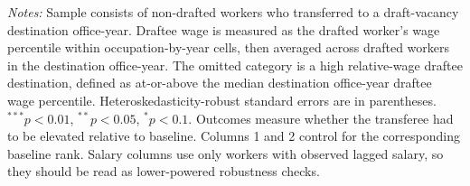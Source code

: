 \begin{table}[htbp]
\centering
\caption{Stretch and Misallocation by Relative Draftee Wage}
\label{tab:stretch-misallocation-relative-draftee-wage}
\scriptsize
\begin{threeparttable}
%
\begin{tablenotes}[flushleft]\footnotesize
\item \textit{Notes:} Sample consists of non-drafted workers who transferred to a draft-vacancy destination office-year. Draftee wage is measured as the drafted worker's wage percentile within occupation-by-year cells, then averaged across drafted workers in the destination office-year. The omitted category is a high relative-wage draftee destination, defined as at-or-above the median destination office-year draftee wage percentile. Heteroskedasticity-robust standard errors are in parentheses. $^{***}p<0.01$, $^{**}p<0.05$, $^{*}p<0.1$. Outcomes measure whether the transferee had to be elevated relative to baseline. Columns 1 and 2 control for the corresponding baseline rank. Salary columns use only workers with observed lagged salary, so they should be read as lower-powered robustness checks.
\end{tablenotes}\end{threeparttable}\end{table}
